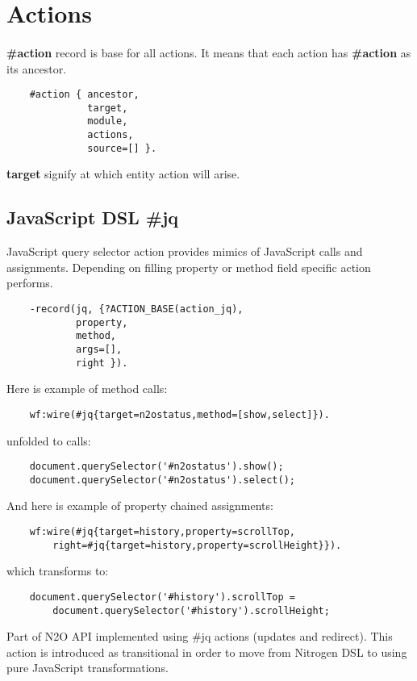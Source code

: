 \section{Actions}

\paragraph{}
{\bf \#action} record is base for all actions. It means that each action
has {\bf \#action} as its ancestor.

\vspace{1\baselineskip}
\begin{lstlisting}
    #action { ancestor,
              target,
              module,
              actions,
              source=[] }.
\end{lstlisting}
\vspace{1\baselineskip}

{\bf target} signify at which entity action will arise.

\subsection{JavaScript DSL {\bf \#jq}}
JavaScript query selector action provides mimics of JavaScript calls and assignments.
Depending on filling property or method field specific action performs.

\vspace{1\baselineskip}
\begin{lstlisting}
    -record(jq, {?ACTION_BASE(action_jq),
            property,
            method,
            args=[],
            right }).
\end{lstlisting}
\vspace{1\baselineskip}

Here is example of method calls:
\begin{lstlisting}
    wf:wire(#jq{target=n2ostatus,method=[show,select]}).
\end{lstlisting}
unfolded to calls:
\begin{lstlisting}
    document.querySelector('#n2ostatus').show();
    document.querySelector('#n2ostatus').select();
\end{lstlisting}
\vspace{1\baselineskip}

And here is example of property chained assignments:
\begin{lstlisting}
    wf:wire(#jq{target=history,property=scrollTop,
        right=#jq{target=history,property=scrollHeight}}).
\end{lstlisting}
which transforms to:
\begin{lstlisting}
    document.querySelector('#history').scrollTop =
        document.querySelector('#history').scrollHeight;
\end{lstlisting}
\vspace{1\baselineskip}
Part of N2O API implemented using \#jq actions (updates and redirect).
This action is introduced as transitional in order to move
from Nitrogen DSL to using pure JavaScript transformations.

